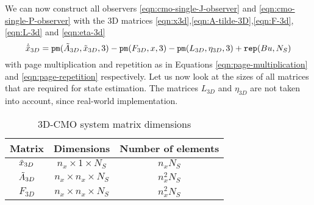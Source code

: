 We can now construct all observers \eqref{eqn:cmo-single-J-observer} and \eqref{eqn:cmo-single-P-observer} with the 3D matrices \eqref{eqn:x3d},\eqref{eqn:A-tilde-3D},\eqref{eqn:F-3d},\eqref{eqn:L-3d} and \eqref{eqn:eta-3d}
\begin{equation*}
    \dot{\tilde{x}}_{3D} = \texttt{pm}(\tilde{A}_{3D},\tilde{x}_{3D},3) - \texttt{pm}(F_{3D},x,3) - \texttt{pm}(L_{3D},\eta_{3D},3) + \texttt{rep}(Bu,N_S)
\end{equation*}
with page multiplication and repetition as in Equations \eqref{eqn:page-multiplication} and \eqref{eqn:page-repetition} respectively. Let us now look at the sizes of all matrices that are required for state estimation. The matrices $L_{3D}$ and $\eta_{3D}$ are not taken into account, since real-world implementation.
\begin{table}[h]
    \centering
    \begin{tabular}{|c|c|c|}
        \toprule
        Matrix  & Dimensions & Number of elements \\
        \midrule
        $\Tilde{x}_{3D}$  & $ n_x \times 1 \times N_S$ & $n_xN_S$ \\
        $\Tilde{A}_{3D}$ & $n_x \times n_x \times N_S$ & $n_x^2N_S$ \\ 
        $F_{3D}$ & $n_x \times n_x \times N_S$ & $n_x^2N_S$ \\
        \bottomrule
    \end{tabular}
    \caption{3D-CMO system matrix dimensions}
    \label{tab:3D-CMO-dimensions}
\end{table}


